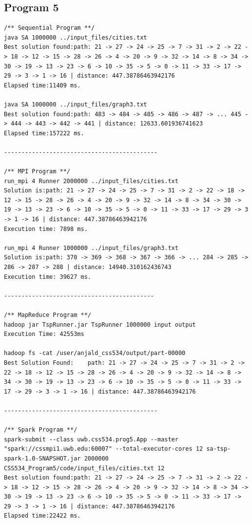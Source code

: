\documentclass{article}
\begin{document}
		\subsection{Program 5} \label{P5_OUT}		
			\begin{lstlisting}
/** Sequential Program **/
java SA 1000000 ../input_files/cities.txt
Best solution found:path: 21 -> 27 -> 24 -> 25 -> 7 -> 31 -> 2 -> 22 -> 18 -> 12 -> 15 -> 28 -> 26 -> 4 -> 20 -> 9 -> 32 -> 14 -> 8 -> 34 -> 30 -> 19 -> 13 -> 23 -> 6 -> 10 -> 35 -> 5 -> 0 -> 11 -> 33 -> 17 -> 29 -> 3 -> 1 -> 16 | distance: 447.38786463942176
Elapsed time:11409 ms.

java SA 1000000 ../input_files/graph3.txt
Best solution found:path: 483 -> 484 -> 485 -> 486 -> 487 -> ... 445 -> 444 -> 443 -> 442 -> 441 | distance: 12633.601936741623
Elapsed time:157222 ms.

--------------------------------------------

/** MPI Program **/
run_mpi 4 Runner 2000000 ../input_files/cities.txt
Solution is:path: 21 -> 27 -> 24 -> 25 -> 7 -> 31 -> 2 -> 22 -> 18 -> 12 -> 15 -> 28 -> 26 -> 4 -> 20 -> 9 -> 32 -> 14 -> 8 -> 34 -> 30 -> 19 -> 13 -> 23 -> 6 -> 10 -> 35 -> 5 -> 0 -> 11 -> 33 -> 17 -> 29 -> 3 -> 1 -> 16 | distance: 447.38786463942176
Execution time: 7898 ms.

run_mpi 4 Runner 1000000 ../input_files/graph3.txt
Solution is:path: 370 -> 369 -> 368 -> 367 -> 366 -> ... 284 -> 285 -> 286 -> 287 -> 288 | distance: 14940.310162436743
Execution time: 39627 ms.

-------------------------------------------

/** MapReduce Program **/
hadoop jar TspRunner.jar TspRunner 1000000 input output
Execution Time: 42553ms

hadoop fs -cat /user/anjald_css534/output/part-00000
Best Solution Found:    path: 21 -> 27 -> 24 -> 25 -> 7 -> 31 -> 2 -> 22 -> 18 -> 12 -> 15 -> 28 -> 26 -> 4 -> 20 -> 9 -> 32 -> 14 -> 8 -> 34 -> 30 -> 19 -> 13 -> 23 -> 6 -> 10 -> 35 -> 5 -> 0 -> 11 -> 33 -> 17 -> 29 -> 3 -> 1 -> 16 | distance: 447.38786463942176

--------------------------------------------

/** Spark Program **/
spark-submit --class uwb.css534.prog5.App --master "spark://cssmpi1.uwb.edu:60007" --total-executor-cores 12 sa-tsp-spark-1.0-SNAPSHOT.jar 2000000 CSS534_Program5/code/input_files/cities.txt 12
Best solution found:path: 21 -> 27 -> 24 -> 25 -> 7 -> 31 -> 2 -> 22 -> 18 -> 12 -> 15 -> 28 -> 26 -> 4 -> 20 -> 9 -> 32 -> 14 -> 8 -> 34 -> 30 -> 19 -> 13 -> 23 -> 6 -> 10 -> 35 -> 5 -> 0 -> 11 -> 33 -> 17 -> 29 -> 3 -> 1 -> 16 | distance: 447.38786463942176
Elapsed time:22422 ms.


\end{lstlisting}
\end{document}
